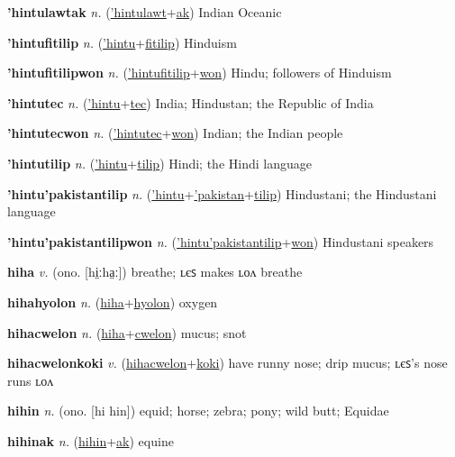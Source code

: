 \textbf{\hypertarget{'hintulawtak}{'hintulawtak}} \textit{n.} (\hyperlink{'hintulawt}{'hintulawt}+\allowbreak \hyperlink{ak}{ak})
Indian Oceanic

\textbf{\hypertarget{'hintufitilip}{'hintufitilip}} \textit{n.} (\hyperlink{'hintu}{'hintu}+\allowbreak \hyperlink{fitilip}{fitilip})
Hinduism

\textbf{\hypertarget{'hintufitilipwon}{'hintufitilipwon}} \textit{n.} (\hyperlink{'hintufitilip}{'hintufitilip}+\allowbreak \hyperlink{won}{won})
Hindu; followers of Hinduism

\textbf{\hypertarget{'hintutec}{'hintutec}} \textit{n.} (\hyperlink{'hintu}{'hintu}+\allowbreak \hyperlink{tec}{tec})
India; Hindustan; the Republic of India

\textbf{\hypertarget{'hintutecwon}{'hintutecwon}} \textit{n.} (\hyperlink{'hintutec}{'hintutec}+\allowbreak \hyperlink{won}{won})
Indian; the Indian people

\textbf{\hypertarget{'hintutilip}{'hintutilip}} \textit{n.} (\hyperlink{'hintu}{'hintu}+\allowbreak \hyperlink{tilip}{tilip})
Hindi; the Hindi language

\textbf{\hypertarget{'hintu'pakistantilip}{'hintu'pakistantilip}} \textit{n.} (\hyperlink{'hintu}{'hintu}+\allowbreak \hyperlink{'pakistan}{'pakistan}+\allowbreak \hyperlink{tilip}{tilip})
Hindustani; the Hindustani language

\textbf{\hypertarget{'hintu'pakistantilipwon}{'hintu'pakistantilipwon}} \textit{n.} (\hyperlink{'hintu'pakistantilip}{'hintu'pakistantilip}+\allowbreak \hyperlink{won}{won})
Hindustani speakers

\textbf{\hypertarget{hiha}{hiha}} \textit{v.} (ono. [hi̤ːha̤ː])
breathe; ʟєꜱ makes ʟᴏᴧ breathe

\textbf{\hypertarget{hihahyolon}{hihahyolon}} \textit{n.} (\hyperlink{hiha}{hiha}+\allowbreak \hyperlink{hyolon}{hyolon})
oxygen

\textbf{\hypertarget{hihacwelon}{hihacwelon}} \textit{n.} (\hyperlink{hiha}{hiha}+\allowbreak \hyperlink{cwelon}{cwelon})
mucus; snot

\textbf{\hypertarget{hihacwelonkoki}{hihacwelonkoki}} \textit{v.} (\hyperlink{hihacwelon}{hihacwelon}+\allowbreak \hyperlink{koki}{koki})
have runny nose; drip mucus; ʟєꜱ’s nose runs ʟᴏᴧ

\textbf{\hypertarget{hihin}{hihin}} \textit{n.} (ono. [hi hin])
equid; horse; zebra; pony; wild butt; Equidae

\textbf{\hypertarget{hihinak}{hihinak}} \textit{n.} (\hyperlink{hihin}{hihin}+\allowbreak \hyperlink{ak}{ak})
equine

